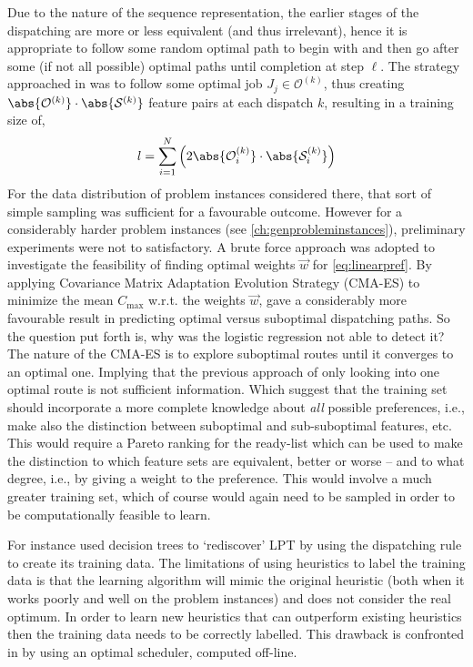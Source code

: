 Due to the nature of the sequence representation, the earlier stages of the dispatching are more or less equivalent (and thus irrelevant), hence it is appropriate to follow some random optimal path to begin with and then go after some (if not all possible) optimal paths until completion at step $\ell$. The strategy approached in  \cite{InRu11a} was to follow some optimal job $J_j\in\mathcal{O}^{(k)}$, thus creating $\abs{\mathcal{O}^{(k)}}\cdot\abs{\mathcal{S}^{(k)}}$ feature pairs at each dispatch $k$, resulting in a training size of,
\begin{equation}\label{eq:sizeS_b}
l =  \sum_{i=1}^N \left(2 \abs{\mathcal{O}^{(k)}_i}\cdot \abs{\mathcal{S}^{(k)}_i} \right)
\end{equation}
For the data distribution of problem instances considered there, that sort of simple sampling was sufficient for a favourable outcome. However for a considerably harder problem instances (see \cref{ch:genprobleminstances}), preliminary experiments were not to satisfactory. 
A brute force approach was adopted to investigate the feasibility of finding optimal weights $\vec{w}$ for \cref{eq:linearpref}. By applying Covariance Matrix Adaptation Evolution Strategy (CMA-ES) \citep{Hansen01} to minimize the mean $C_{\max}$  w.r.t. the weights $\vec{w}$, gave a considerably more favourable result in predicting optimal versus suboptimal dispatching paths. So the question put forth is, why was the logistic regression not able to detect it?
The nature of the CMA-ES is to explore suboptimal routes until it converges to an optimal one. Implying that the previous approach of only looking into one optimal route is not sufficient information. Which suggest that the training set should incorporate a more complete knowledge about \emph{all} possible preferences, i.e., make also the distinction between suboptimal and sub-suboptimal features, etc.  This would require a Pareto ranking for the ready-list which can be used to make the distinction to which feature sets are equivalent, better or worse -- and to what degree, i.e., by giving a weight to the preference. This would involve a much greater training set, which of course would again need to be sampled in order to be computationally feasible to learn. 

For instance \cite{Siggi05} used decision trees to `rediscover' LPT by using the dispatching rule to create its training data. The limitations of using heuristics to label the training data is that the learning algorithm will mimic the original heuristic (both when it works poorly and well on the problem instances) and does not consider the real optimum. In order to learn new heuristics that can outperform existing heuristics then the training data needs to be correctly labelled. This drawback is confronted in \citep{Malik08,Russell09,Siggi10} by using an optimal scheduler, computed off-line. 

